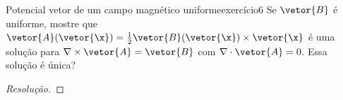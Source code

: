 \begin{exercício}{Potencial vetor de um campo magnético uniforme}{exercício6}
    Se \(\vetor{B}\) é uniforme, mostre que \(\vetor{A}(\vetor{\x}) = \frac12\vetor{B}(\vetor{\x})\times \vetor{\x}\) é uma solução para \(\nabla \times \vetor{A} = \vetor{B}\) com \(\nabla \cdot \vetor{A} = 0\). Essa solução é única?
\end{exercício}
\begin{proof}[Resolução]

\end{proof}
